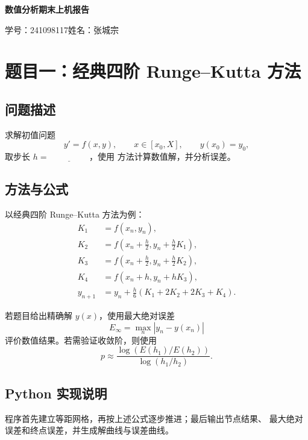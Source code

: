 \documentclass[UTF8,a4paper,11pt]{ctexart}
\newcommand{\CourseName}{数值分析期末上机}
\newcommand{\ProblemTitle}{题目一：经典四阶 Runge--Kutta 方法}
\newcommand{\StudentID}{241098117}
\newcommand{\StudentName}{张城宗}
\begin{document}
\begin{center}
  {\LARGE\bfseries \CourseName 报告}

  \vspace{0.3em}
  学号：\StudentID\qquad 姓名：\StudentName
\end{center}

\section{\ProblemTitle}

\subsection{问题描述}

求解初值问题
\[
  y'=f(x,y),\qquad x\in[x_0,X],\qquad y(x_0)=y_0,
\]
取步长 $h=\underline{\hspace{2cm}}$，使用
\underline{\hspace{4cm}} 方法计算数值解，并分析误差。

\subsection{方法与公式}

以经典四阶 Runge--Kutta 方法为例：
\[
  \begin{aligned}
    K_1&=f(x_n,y_n),\\
    K_2&=f\left(x_n+\frac h2,y_n+\frac h2K_1\right),\\
    K_3&=f\left(x_n+\frac h2,y_n+\frac h2K_2\right),\\
    K_4&=f(x_n+h,y_n+hK_3),\\
    y_{n+1}&=y_n+\frac h6(K_1+2K_2+2K_3+K_4).
  \end{aligned}
\]

若题目给出精确解 $y(x)$，使用最大绝对误差
\[
  E_\infty=\max_n|y_n-y(x_n)|
\]
评价数值结果。若需验证收敛阶，则使用
\[
  p\approx\frac{\log(E(h_1)/E(h_2))}{\log(h_1/h_2)}.
\]

\subsection{Python 实现说明}

程序首先建立等距网格，再按上述公式逐步推进；最后输出节点结果、
最大绝对误差和终点误差，并生成解曲线与误差曲线。

\end{document}
